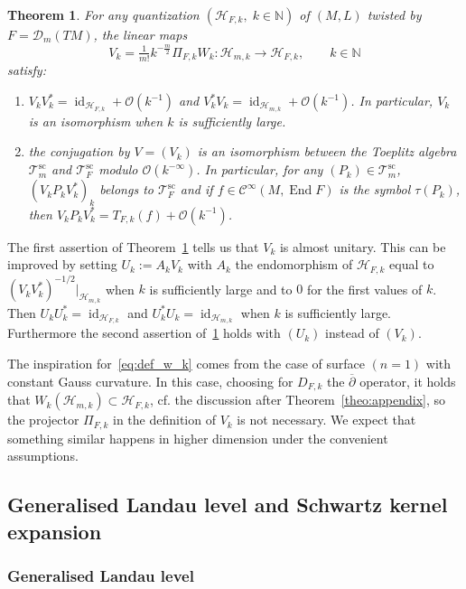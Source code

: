\documentclass[10pt,a4paper]{article}
\newtheorem{theo}{Theorem}[section]
\theoremstyle{definition}
\numberwithin{equation}{section}
\newcommand{\N}{{\mathbb{N}}}
\newcommand{\con}{\overline}
\newcommand{\op}{\operatorname}
\newcommand{\Ci}{{\mathcal{C}}^{\infty}}
\newcommand{\bigo}{\mathcal{O}}
\newcommand{\D}{\mathcal{D}}
\newcommand{\Hilb}{\mathcal{H}}
\newcommand{\clT}{\mathcal{T}}
\begin{document}
\begin{theo}\label{theo:ladder}
For any quantization $(\Hilb_{F,k}, \; k \in \N)$ of $(M,L)$
twisted by $F= \D_m (TM)$, the linear maps
\[
V_k = \tfrac{1}{m!} k^{-\frac{m}{2}} \Pi_{F,k} W_k
: \Hilb_{m,k} \rightarrow \Hilb_{F,k}, \qquad k \in \N
\]
satisfy:
\begin{enumerate}
\item $V_kV_k^* = \op{id}_{\Hilb_{F,k}} + \bigo (k^{-1})$ and $V_k^* V_k =\op{id}_{\Hilb_{m,k}} + \bigo (k^{-1})$. In particular, $V_k$ is an isomorphism when $k$ is sufficiently large.
\item the conjugation by $V=(V_k)$ is an isomorphism between the Toeplitz algebra $ \clT^{\op{sc}}_m$ and $\clT_F^{\op{sc}}$ modulo $\bigo (k^{-\infty})$. In particular, for any $(P_k) \in
\clT^{\op{sc}}_m$, $(V_k P_k V_k^*)_k$ belongs to $\clT_F^{\op{sc}}$ and if $f \in \Ci (M, \op{End} F)$ is the symbol $ \tau(P_k)$, then $V_k P_k V_k^* = T_{F,k} (f) + \bigo (k^{-1})$.
\end{enumerate}
\end{theo}

The first assertion of Theorem~\ref{theo:ladder} tells us that $V_k$ is almost unitary. This can be improved by setting $U_k := A_k V_k$ with $A_k$ the endomorphism of $\Hilb_{F,k}$ equal to $(V_kV_k^*)^{-1/2} |_{\Hilb_{m,k}}$ when $k$ is sufficiently large and to $0$ for the first values of $k$. Then $U_k U_k^* = \op{id}_{\Hilb_{F,k}}$ and $U_k^* U_k =
\op{id}_{\Hilb_{m,k}}$ when $k$ is sufficiently large. Furthermore the second assertion of~\ref{theo:ladder} holds with $(U_k)$ instead of $(V_k)$.

 The inspiration for~\eqref{eq:def_w_k} comes from the case of surface $(n =1)$ with constant Gauss curvature. In this case, choosing for $D_{F,k}$ the $
\con\partial$ operator, it holds that $W_k (
\Hilb_{m,k}) \subset \Hilb_{F,k}$, cf. the discussion after Theorem~\ref{theo:appendix}, so the projector $\Pi_{F,k}$ in the definition of $V_k$ is not necessary. We expect that something similar happens in higher dimension under the convenient assumptions. 


\subsection{Generalised Landau level and Schwartz kernel expansion}

\subsubsection{Generalised Landau level}
\end{document}

